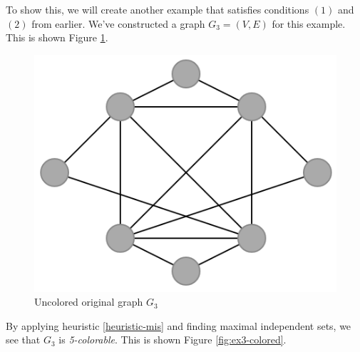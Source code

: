 \documentclass{article}
\newcounter{heuristic} \setcounter{heuristic}{0}
\theoremstyle{definition}
\begin{document}
To show this, we will create another example that satisfies conditions \((1)\) and \((2)\) from earlier. We've constructed a graph \(G_3 = (V,E)\) for this example. This is shown Figure \ref{fig:ex3-uncolored}.

\begin{figure}[H]
\centering
\includegraphics[scale=0.5]{images/mis-1.png}
\caption{Uncolored original graph \(G_3\)}\label{fig:ex3-uncolored}
\end{figure}

By applying heuristic \ref{heuristic-mis} and finding maximal independent sets, we see that \(G_3\) is \emph{5-colorable}. This is shown Figure \ref{fig:ex3-colored}.

\newpage
\end{document}
